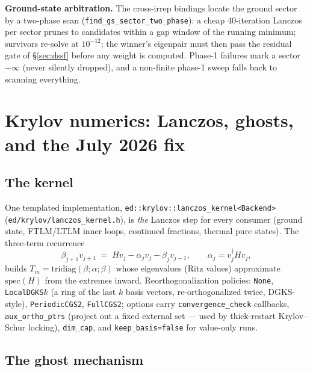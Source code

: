 \documentclass[11pt]{article}
\newcommand{\file}[1]{\texttt{\small #1}}
\begin{document}
\textbf{Ground-state arbitration.} The cross-irrep bindings locate the
ground sector by a two-phase scan (\texttt{find\_gs\_sector\_two\_phase}):
a cheap 40-iteration Lanczos per sector prunes to candidates within a gap
window of the running minimum; survivors re-solve at $10^{-12}$; the
winner's eigenpair must then pass the residual gate of
\S\ref{sec:dssf} before any weight is computed. Phase-1 failures mark a
sector $-\infty$ (never silently dropped), and a non-finite phase-1 sweep
falls back to scanning everything.

\section{Krylov numerics: Lanczos, ghosts, and the July 2026 fix}
\label{sec:lanczos}

\subsection{The kernel}

One templated implementation, \texttt{ed::krylov::lanczos\_kernel<Backend>}
(\file{ed/krylov/lanczos\_kernel.h}), is \emph{the} Lanczos step for every
consumer (ground state, FTLM/LTLM inner loops, continued fractions, thermal
pure states). The three-term recurrence
\begin{equation}
  \beta_{j+1} v_{j+1} \;=\; H v_j - \alpha_j v_j - \beta_j v_{j-1},
  \qquad \alpha_j = v_j^\dagger H v_j,
  \label{eq:lanczos}
\end{equation}
builds $T_m = \mathrm{tridiag}(\beta; \alpha; \beta)$ whose eigenvalues
(Ritz values) approximate $\mathrm{spec}(H)$ from the extremes inward.
Reorthogonalization policies: \texttt{None}, \texttt{LocalDGKS$k$} (a ring
of the last $k$ basis vectors, re-orthogonalized twice, DGKS-style),
\texttt{PeriodicCGS2}, \texttt{FullCGS2}; options carry
\texttt{convergence\_check} callbacks, \texttt{aux\_ortho\_ptrs} (project
out a fixed external set --- used by thick-restart Krylov--Schur locking),
\texttt{dim\_cap}, and \texttt{keep\_basis=false} for value-only runs.

\subsection{The ghost mechanism}
\end{document}

